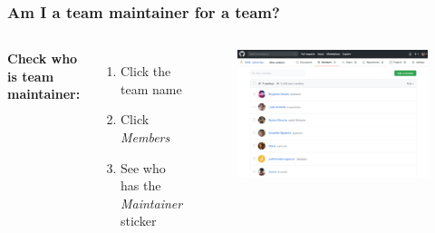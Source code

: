 \documentclass[aspectratio=169]{beamer} %
\begin{document}
\begin{frame}
	\frametitle{Am I a team maintainer for a team?}
	\begin{columns}[c]
		
		\textbf{Check who is team maintainer:}
		\begin{enumerate}
			\item Click the team name
			\item Click \textit{Members}
			\item See who has the \textit{Maintainer} sticker
		\end{enumerate}
		
		\begin{figure}
			\centering
			\includegraphics[width=1\linewidth]{./img/who-is-team-maintainer}
		\end{figure}
	\end{columns}
\end{frame}
\end{document}
